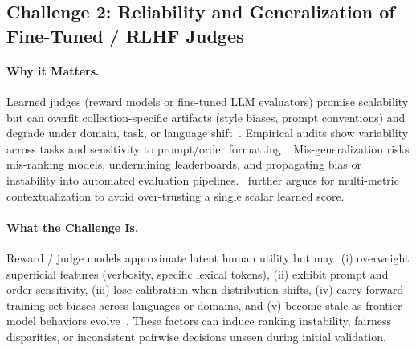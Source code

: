 \subsection{Challenge 2: Reliability and Generalization of Fine-Tuned / RLHF Judges}
\paragraph{Why it Matters.} Learned judges (reward models or fine-tuned LLM evaluators) promise scalability but can overfit collection-specific artifacts (style biases, prompt conventions) and degrade under domain, task, or language shift~\cite{stiennon2020learning, ouyang2022training, hada2024metal, kocmi2023llmmt}. Empirical audits show variability across tasks and sensitivity to prompt/order formatting~\cite{bavaresco2024judgebench, zheng2023judgelm, li2024_llmsasjudges}. Mis-generalization risks mis-ranking models, undermining leaderboards, and propagating bias or instability into automated evaluation pipelines.~\cite{liang2022helm} further argues for multi-metric contextualization to avoid over-trusting a single scalar learned score.
\paragraph{What the Challenge Is.} Reward / judge models approximate latent human utility but may: (i) overweight superficial features (verbosity, specific lexical tokens), (ii) exhibit prompt and order sensitivity, (iii) lose calibration when distribution shifts, (iv) carry forward training-set biases across languages or domains, and (v) become stale as frontier model behaviors evolve~\cite{li2024_llmsasjudges, bavaresco2024judgebench, hada2024metal}. These factors can induce ranking instability, fairness disparities, or inconsistent pairwise decisions unseen during initial validation.
